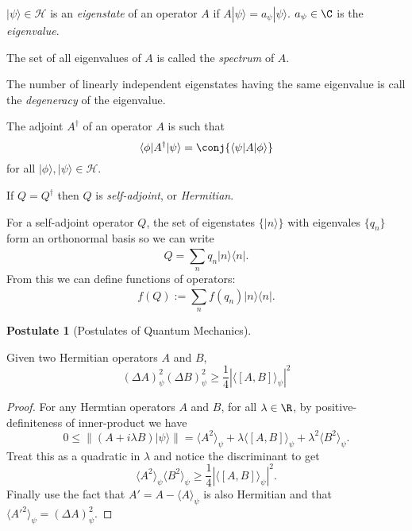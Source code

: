 \documentclass[a4paper]{article}
\renewcommand*{\H}{\mathcal{H}}
\theoremstyle{definition}
\newtheorem*{postulate}{Postulate}
\begin{document}
\begin{defi}
  \(|\psi\rangle \in \H\) is an \emph{eigenstate} of an operator \(A\) if \(A|\psi\rangle = a_\psi|\psi\rangle\). \(a_\psi\in\C\) is the \emph{eigenvalue}.

  The set of all eigenvalues of \(A\) is called the \emph{spectrum} of \(A\).

  The number of linearly independent eigenstates having the same eigenvalue is call the \emph{degeneracy} of the eigenvalue.
\end{defi}

\begin{defi}[Adjoint]
  The adjoint \(A^\dag\) of an operator \(A\) is such that
  \[
    \langle\phi|A^\dag|\psi\rangle = \conj{\langle\psi|A|\phi\rangle} 
  \] 
  for all \(|\phi\rangle, |\psi\rangle \in \H\).
\end{defi}

\begin{defi}
  If \(Q = Q^\dag\) then \(Q\) is \emph{self-adjoint}, or \emph{Hermitian}.
\end{defi}

For a self-adjoint operator \(Q\), the set of eigenstates \(\{|n\rangle\}\) with eigenvales \(\{q_n\}\) form an orthonormal basis so we can write
\[
  Q = \sum_{n}^{ }q_n |n\rangle \langle n|.
\]
From this we can define functions of operators:
\[
  f(Q) := \sum_{n}^{ }f(q_n) |n\rangle \langle n|.
\]

\begin{postulate}[Postulates of Quantum Mechanics]
  \blindtext
\end{postulate}

\begin{prop}
  Given two Hermitian operators \(A\) and \(B\),
  \[
    (\Delta A)_\psi^2(\Delta B)_\psi^2 \geq \frac{1}{4}|\langle[A,B]\rangle_\psi|^2
  \]
\end{prop}

\begin{proof}
  For any Hermtian operators \(A\) and \(B\), for all \(\lambda \in \R\), by positive-definiteness of inner-product we have
  \[
    0 \leq \|(A+i\lambda B)|\psi\rangle\| = \langle A^2\rangle_\psi + \lambda\langle[A,B]\rangle_\psi + \lambda^2\langle B^2\rangle_\psi.
  \]
  Treat this as a quadratic in \(\lambda\) and notice the discriminant to get
  \[
    \langle A^2\rangle_\psi \langle B^2\rangle_\psi \geq \frac{1}{4}|\langle[A,B]\rangle_\psi|^2.
  \]
  Finally use the fact that \(A'=A-\langle A\rangle_\psi\) is also Hermitian and that \(\langle A'^2\rangle_\psi = (\Delta A)_\psi^2\).
\end{proof}
\end{document}
